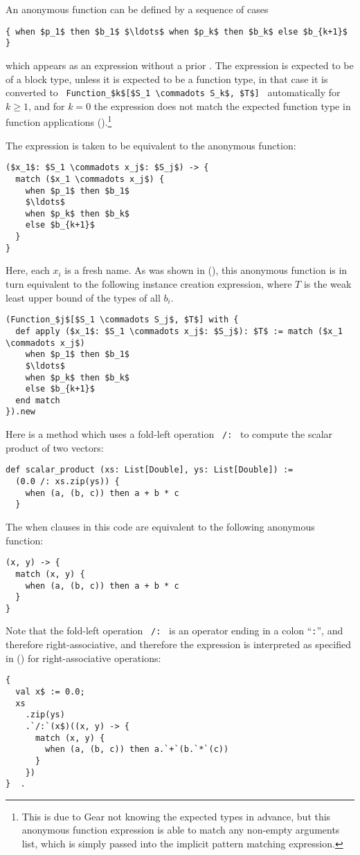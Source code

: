 An anonymous function can be defined by a sequence of cases
\begin{lstlisting}
{ when $p_1$ then $b_1$ $\ldots$ when $p_k$ then $b_k$ else $b_{k+1}$ }
\end{lstlisting}
which appears as an expression without a prior . The expression is expected to be of a block type, unless it is expected to be a function type, in that case it is converted to ~\lstinline!Function_$k$[$S_1 \commadots S_k$, $T$]!~ automatically for $k \geq 1$, and for $k = 0$ the expression does not match the expected function type in function applications ().\footnote{This is due to Gear not knowing the expected types in advance, but this anonymous function expression is able to match any non-empty arguments list, which is simply passed into the implicit pattern matching expression.} 

The expression is taken to be equivalent to the anonymous function:
\begin{lstlisting}
($x_1$: $S_1 \commadots x_j$: $S_j$) -> {
  match ($x_1 \commadots x_j$) {
    when $p_1$ then $b_1$
    $\ldots$
    when $p_k$ then $b_k$
    else $b_{k+1}$
  }
}
\end{lstlisting}

Here, each $x_i$ is a fresh name. As was shown in (), this anonymous function is in turn equivalent to the following instance creation expression, where $T$ is the weak least upper bound of the types of all $b_i$. 

\begin{lstlisting}
(Function_$j$[$S_1 \commadots S_j$, $T$] with {
  def apply ($x_1$: $S_1 \commadots x_j$: $S_j$): $T$ := match ($x_1 \commadots x_j$)
    when $p_1$ then $b_1$
    $\ldots$
    when $p_k$ then $b_k$
    else $b_{k+1}$
  end match
}).new
\end{lstlisting}

\example Here is a method which uses a fold-left operation ~\lstinline!/:!~ to compute the scalar product of two vectors:
\begin{lstlisting}
def scalar_product (xs: List[Double], ys: List[Double]) := 
  (0.0 /: xs.zip(ys)) {
    when (a, (b, c)) then a + b * c
  }
\end{lstlisting}
The when clauses in this code are equivalent to the following anonymous function:
\begin{lstlisting}
(x, y) -> { 
  match (x, y) {
    when (a, (b, c)) then a + b * c
  }
}
\end{lstlisting}
Note that the fold-left operation ~\lstinline!/:!~ is an operator ending in a colon ``\lstinline!:!'', and therefore right-associative, and therefore the expression is interpreted as specified in () for right-associative operations: 

\begin{minipage}{\linewidth}
\begin{lstlisting}[mathescape=false]
{ 
  val x$ := 0.0; 
  xs
    .zip(ys)
    .`/:`(x$)((x, y) -> {
      match (x, y) {
        when (a, (b, c)) then a.`+`(b.`*`(c))
      }
    })
}  . 
\end{lstlisting}
\end{minipage}










